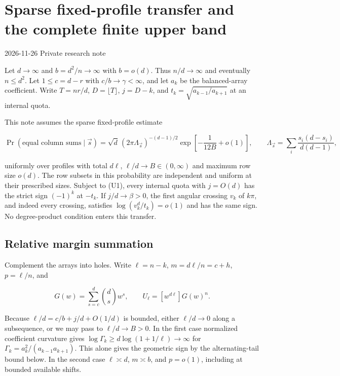 \section{Sparse fixed-profile transfer and the complete finite upper band}\label{sec:sublinear-b-generic-upper-transfer}

2026-11-26 \enspace Private research note

Let $d\to\infty$ and $b=d^2/n\to\infty$ with $b=o(d)$. Thus $n/d\to\infty$ and eventually $n\le d^2$. Let $1\le c=d-r$ with $c/b\to\gamma<\infty$, and let $a_k$ be the balanced-array coefficient. Write $T=nr/d$, $D=\lfloor T\rfloor$, $j=D-k$, and $t_k=\sqrt{a_{k-1}/a_{k+1}}$ at an internal quota.

This note assumes the sparse fixed-profile estimate

\begin{equation}
\Pr(\text{equal column sums}\mid\vec s)
=\sqrt d\,(2\pi\Lambda_{\vec s})^{-(d-1)/2}
    \exp\left[-\frac1{12B}+o(1)\right],
\qquad
\Lambda_{\vec s}=\sum_i\frac{s_i(d-s_i)}{d(d-1)},
\tag{U1}
\end{equation}

uniformly over profiles with total $d\ell$, $\ell/d\to B\in(0,\infty)$ and maximum row size $o(d)$. The row subsets in this probability are independent and uniform at their prescribed sizes. Subject to (U1), every internal quota with $j=O(d)$ has the strict sign $(-1)^k$ at $-t_k$. If $j/d\to\beta>0$, the first angular crossing $v_k$ of $k\pi$, and indeed every crossing, satisfies $\log(v_k^d/t_k)=o(1)$ and has the same sign. No degree-product condition enters this transfer.

\subsection{Relative margin summation}

Complement the arrays into holes. Write $\ell=n-k$, $m=d\ell/n=c+h$, $p=\ell/n$, and

\begin{equation*}
G(w)=\sum_{s=c}^d\binom ds w^s,\qquad U_\ell=[w^{d\ell}]G(w)^n.
\end{equation*}

Because $\ell/d=c/b+j/d+O(1/d)$ is bounded, either $\ell/d\to0$ along a subsequence, or we may pass to $\ell/d\to B>0$. In the first case normalized coefficient curvature gives $\log\Gamma_k\ge d\log(1+1/\ell)\to\infty$ for $\Gamma_k=a_k^2/(a_{k-1}a_{k+1})$. This alone gives the geometric sign by the alternating-tail bound below. In the second case $\ell\asymp d$, $m\asymp b$, and $p=o(1)$, including at bounded available shifts.

